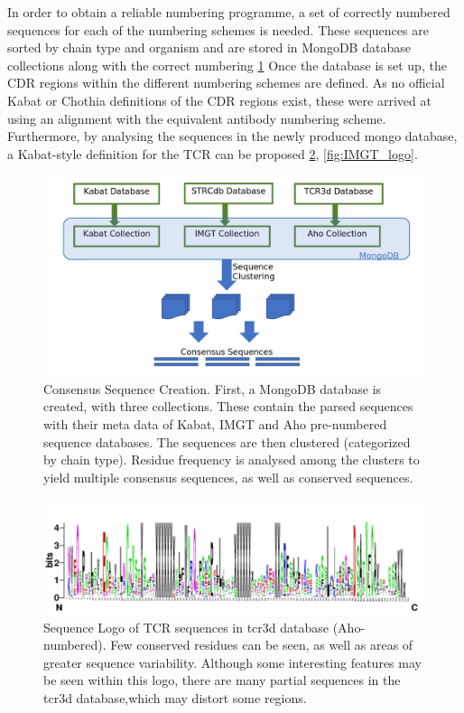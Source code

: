 In order to obtain a reliable numbering programme, a set of correctly numbered sequences for each of the numbering schemes is needed. These sequences are sorted by chain type and organism and are stored in MongoDB database collections along with the correct numbering \ref{fig:database_creation} Once the database is set up, the CDR regions within the different numbering schemes are defined. As no official Kabat or Chothia definitions of the CDR regions exist, these were arrived at using an alignment with the equivalent antibody numbering scheme\cite{AAAAA}.
Furthermore, by analysing the sequences in the newly produced mongo database, a Kabat-style definition for the TCR can be proposed \ref{fig:Aho_logo}, \ref{fig:IMGT_logo}.

\begin{figure}
    \centering
    \includegraphics[width=\textwidth,height=\textheight,keepaspectratio]{database_creation.png}
    \caption{Consensus Sequence Creation. First, a MongoDB database is created, with three collections. These contain the parsed sequences with their meta data of Kabat, IMGT and Aho pre-numbered sequence databases. The sequences are then clustered (categorized by chain type). Residue frequency is analysed among the clusters to yield multiple consensus sequences, as well as conserved sequences.}
    \label{fig:database_creation}
\end{figure}


\begin{figure}
    \centering
    \includegraphics[width=\textwidth,height=\textheight,keepaspectratio]{Aho_logo.png}
    \caption{ Sequence Logo of TCR sequences in tcr3d database (Aho-numbered). Few conserved residues can be seen, as well as areas of greater sequence variability. Although some interesting features may be seen within this logo, there are many partial sequences in the  tcr3d database,which may distort some regions. }
    \label{fig:Aho_logo}
\end{figure}

